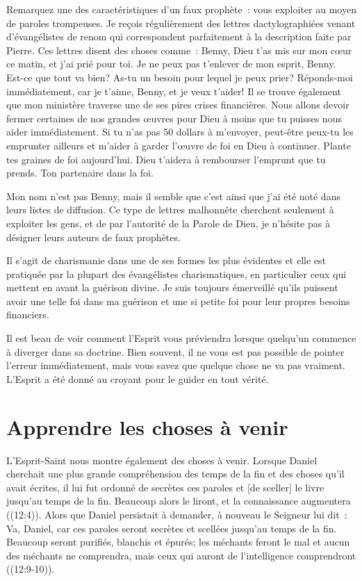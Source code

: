Remarquez une des caractéristiques d'un faux prophète~:
 \og vous exploiter au moyen de paroles trompeuses. \fg{}
 Je reçois régulièrement des lettres dactylographiées
 venant d'évangélistes de renom qui correspondent parfaitement
 à la description faite par Pierre.
 Ces lettres disent des choses comme~:
 \og Benny, Dieu t'as mis sur mon cœur ce matin, et j'ai prié pour toi.
 Je ne peux pas t'enlever de mon esprit, Benny.
 Est-ce que tout va bien? As-tu un besoin pour lequel je peux prier?
 Réponds-moi immédiatement, car je t'aime, Benny, et je veux t'aider!
 Il se trouve également que mon ministère traverse
 une de ses pires crises financières.
 Nous allons devoir fermer certaines de nos grandes œuvres pour Dieu
 à moins que tu puisses nous aider immédiatement.
 Si tu n'as pas 50 dollars à m'envoyer, peut-être peux-tu les emprunter
 ailleurs et m'aider à garder l'œuvre de foi en Dieu à continuer.
 Plante tes graines de foi aujourd'hui.
 Dieu t'aidera à rembourser l'emprunt que tu prends.
 Ton partenaire dans la foi. \fg{}

Mon nom n'est pas Benny, mais il semble que c'est ainsi que j'ai été noté
 dans leurs listes de diffusion.
 Ce type de lettres malhonnête cherchent seulement à exploiter les gens,
 et de par l'autorité de la Parole de Dieu,
 je n'hésite pas à désigner leurs auteurs de faux prophètes.

Il s'agit de charismanie dans une de ses formes les plus évidentes
 et elle est pratiquée par la plupart des évangélistes charismatiques,
 en particulier ceux qui mettent en avant la guérison divine.
 Je suis toujours émerveillé qu'ils puissent avoir une telle foi
 dans ma guérison et une si petite foi pour leur propres besoins financiers.

Il est beau de voir comment l'Esprit vous préviendra
 lorsque quel\-qu'un commence à diverger dans sa doctrine.
 Bien souvent, il ne vous est pas possible de pointer l'erreur immédiatement,
 mais vous savez que quelque chose ne va pas vraiment.
 L'Esprit a été donné au croyant pour le guider en tout vérité.


\section*{Apprendre les choses à venir}

L'Esprit-Saint nous montre également des choses à venir.
 Lorsque Daniel cherchait une plus grande compréhension des temps de la fin
 et des choses qu'il avait écrites, il lui fut ordonné de
 \og [tenir] secrètes ces paroles et [de sceller] le livre
 jusqu'au temps de la fin.
 Beaucoup alors le liront, et la connaissance augmentera \fg{}
 ((12:4)).
 Alors que Daniel persistait à demander, à nouveau le Seigneur lui dit~:
 \og Va, Daniel, car ces paroles seront secrètes
 et scellées jusqu'au temps de la fin.
 Beaucoup seront purifiés, blanchis et épurés;
 les méchants feront le mal et aucun des méchants ne comprendra,
 mais ceux qui auront de l'intelligence comprendront \fg{}
 ((12:9-10)).

